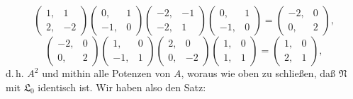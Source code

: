 \[
\begin{pmatrix} 1, & 1 \\ 2, & -2 \end{pmatrix}\begin{pmatrix} 0, & 1 \\ -1, & 0 \end{pmatrix}\begin{pmatrix} -2, & -1 \\ -2, & 1 \end{pmatrix}\begin{pmatrix} 0, & 1 \\ -1, & 0 \end{pmatrix} = \begin{pmatrix} -2, & 0 \\ 0, & 2 \end{pmatrix},
\]
\[
\begin{pmatrix} -2, & 0 \\ 0, & 2 \end{pmatrix}\begin{pmatrix} 1, & 0 \\ -1, & 1 \end{pmatrix}\begin{pmatrix} 2, & 0 \\ 0, & -2 \end{pmatrix}\begin{pmatrix} 1, & 0 \\ 1, & 1 \end{pmatrix} = \begin{pmatrix} 1, & 0 \\ 2, & 1 \end{pmatrix},
\]
d.\,h. $A^2$ und mithin alle Potenzen von $A$, woraus wie oben zu schließen, daß $\mathfrak{N}$ mit $\mathfrak{L}_0$ identisch ist. Wir haben also den Satz:


